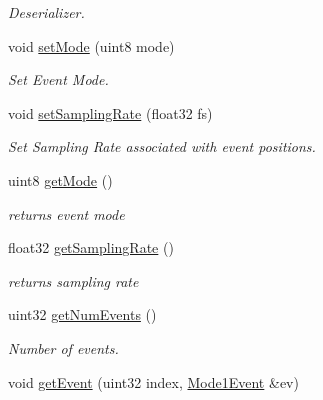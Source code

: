 \begin{DoxyCompactItemize}
\begin{DoxyCompactList}\small\item\em Deserializer. \item\end{DoxyCompactList}\item 
void \hyperlink{classgdf_1_1_event_header_a7384f73f64a72bb3c4a8a30423f8c1fd}{setMode} (uint8 mode)
\begin{DoxyCompactList}\small\item\em Set Event Mode. \item\end{DoxyCompactList}\item 
void \hyperlink{classgdf_1_1_event_header_a2be9223eaf498c7d71ab0018205062b6}{setSamplingRate} (float32 fs)
\begin{DoxyCompactList}\small\item\em Set Sampling Rate associated with event positions. \item\end{DoxyCompactList}\item 
\hypertarget{classgdf_1_1_event_header_a621cff50e4c4e2342a5de4fdf696d346}{
uint8 \hyperlink{classgdf_1_1_event_header_a621cff50e4c4e2342a5de4fdf696d346}{getMode} ()}
\label{classgdf_1_1_event_header_a621cff50e4c4e2342a5de4fdf696d346}

\begin{DoxyCompactList}\small\item\em returns event mode \item\end{DoxyCompactList}\item 
\hypertarget{classgdf_1_1_event_header_ae667a24691800816b04ae615ee9f20b2}{
float32 \hyperlink{classgdf_1_1_event_header_ae667a24691800816b04ae615ee9f20b2}{getSamplingRate} ()}
\label{classgdf_1_1_event_header_ae667a24691800816b04ae615ee9f20b2}

\begin{DoxyCompactList}\small\item\em returns sampling rate \item\end{DoxyCompactList}\item 
\hypertarget{classgdf_1_1_event_header_ace93b5ce5d3621cc5dbf2c69d97b10ad}{
uint32 \hyperlink{classgdf_1_1_event_header_ace93b5ce5d3621cc5dbf2c69d97b10ad}{getNumEvents} ()}
\label{classgdf_1_1_event_header_ace93b5ce5d3621cc5dbf2c69d97b10ad}

\begin{DoxyCompactList}\small\item\em Number of events. \item\end{DoxyCompactList}\item 
\hypertarget{classgdf_1_1_event_header_a02e9ab180df492a86f59295bd2fd24cd}{
void \hyperlink{classgdf_1_1_event_header_a02e9ab180df492a86f59295bd2fd24cd}{getEvent} (uint32 index, \hyperlink{structgdf_1_1_mode1_event}{Mode1Event} \&ev)}
\label{classgdf_1_1_event_header_a02e9ab180df492a86f59295bd2fd24cd}


\end{DoxyCompactItemize}

